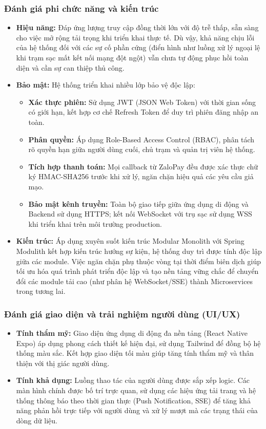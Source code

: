\subsubsection{Đánh giá phi chức năng và kiến trúc}
\begin{itemize}
    \item \textbf{Hiệu năng:} Đáp ứng lượng truy cập đồng thời lớn với độ trễ thấp, sẵn sàng cho việc mở rộng tải trọng khi triển khai thực tế. Dù vậy, khả năng chịu lỗi của hệ thống đối với các sự cố phần cứng (điển hình như luồng xử lý ngoại lệ khi trạm sạc mất kết nối mạng đột ngột) vẫn chưa tự động phục hồi toàn diện và cần sự can thiệp thủ công.
    \item \textbf{Bảo mật:} Hệ thống triển khai nhiều lớp bảo vệ độc lập:
        \begin{itemize}
            \item \textbf{Xác thực phiên:} Sử dụng JWT (JSON Web Token) với thời gian sống có giới hạn, kết hợp cơ chế Refresh Token để duy trì phiên đăng nhập an toàn.
            \item \textbf{Phân quyền:} Áp dụng Role-Based Access Control (RBAC), phân tách rõ quyền hạn giữa người dùng cuối, chủ trạm và quản trị viên hệ thống.
            \item \textbf{Tích hợp thanh toán:} Mọi callback từ ZaloPay đều được xác thực chữ ký HMAC-SHA256 trước khi xử lý, ngăn chặn hiệu quả các yêu cầu giả mạo.
            \item \textbf{Bảo mật kênh truyền:} Toàn bộ giao tiếp giữa ứng dụng di động và Backend sử dụng HTTPS; kết nối WebSocket với trụ sạc sử dụng WSS khi triển khai trên môi trường production.
        \end{itemize}
    \item \textbf{Kiến trúc:} Áp dụng xuyên suốt kiến trúc Modular Monolith với Spring Modulith kết hợp kiến trúc hướng sự kiện, hệ thống duy trì được tính độc lập giữa các module. Việc ngăn chặn phụ thuộc vòng tại thời điểm biên dịch giúp tối ưu hóa quá trình phát triển độc lập và tạo nền tảng vững chắc để chuyển đổi các module tải cao (như phân hệ WebSocket/SSE) thành Microservices trong tương lai.
\end{itemize}

\subsubsection{Đánh giá giao diện và trải nghiệm người dùng (UI/UX)}
\begin{itemize}
    \item \textbf{Tính thẩm mỹ:} Giao diện ứng dụng di động đa nền tảng (React Native Expo) áp dụng phong cách thiết kế hiện đại, sử dụng Tailwind để đồng bộ hệ thống màu sắc. Kết hợp giao diện tối màu giúp tăng tính thẩm mỹ và thân thiện với thị giác người dùng.
    \item \textbf{Tính khả dụng:} Luồng thao tác của người dùng được sắp xếp logic. Các màn hình chính được bố trí trực quan, sử dụng các hiệu ứng tải trang và hệ thống thông báo theo thời gian thực (Push Notification, SSE) để tăng khả năng phản hồi trực tiếp với người dùng và xử lý mượt mà các trạng thái của dòng dữ liệu.
\end{itemize}
